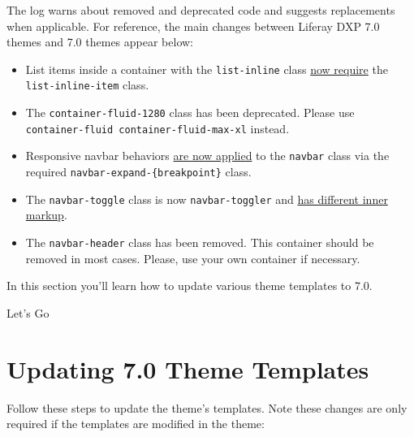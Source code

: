 The log warns about removed and deprecated code and suggests
replacements when applicable. For reference, the main changes between
Liferay DXP 7.0 themes and 7.0 themes appear below:

\begin{itemize}
\item
  List items inside a container with the \texttt{list-inline} class
  \href{https://getbootstrap.com/docs/4.3/migration/\#typography}{now
  require} the \texttt{list-inline-item} class.
\item
  The \texttt{container-fluid-1280} class has been deprecated. Please
  use \texttt{container-fluid\ container-fluid-max-xl} instead.
\item
  Responsive navbar behaviors
  \href{https://getbootstrap.com/docs/4.3/migration/\#navbar}{are now
  applied} to the \texttt{navbar} class via the required
  \texttt{navbar-expand-\{breakpoint\}} class.
\item
  The \texttt{navbar-toggle} class is now \texttt{navbar-toggler} and
  \href{https://getbootstrap.com/docs/4.3/migration/\#navbar}{has
  different inner markup}.
\item
  The \texttt{navbar-header} class has been removed. This container
  should be removed in most cases. Please, use your own container if
  necessary.
\end{itemize}

In this section you'll learn how to update various theme templates to
7.0.

Let's Go{}

\chapter{Updating 7.0 Theme
Templates}\label{updating-7.0-theme-templates}

Follow these steps to update the theme's templates. Note these changes
are only required if the templates are modified in the theme:

